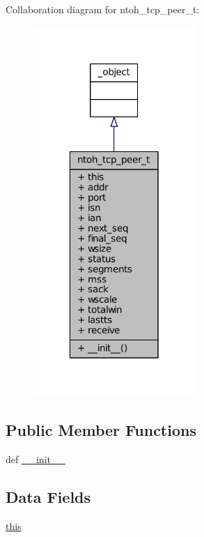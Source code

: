 Collaboration diagram for ntoh\-\_\-tcp\-\_\-peer\-\_\-t\-:
\nopagebreak
\begin{figure}[H]
\begin{center}
\leavevmode
\includegraphics[width=174pt]{classlibntoh_1_1ntoh__tcp__peer__t__coll__graph}
\end{center}
\end{figure}
\subsection*{Public Member Functions}
\begin{DoxyCompactItemize}
\item 
def \hyperlink{classlibntoh_1_1ntoh__tcp__peer__t_ac775ee34451fdfa742b318538164070e}{\-\_\-\-\_\-init\-\_\-\-\_\-}
\end{DoxyCompactItemize}
\subsection*{Data Fields}
\begin{DoxyCompactItemize}
\item 
\hyperlink{classlibntoh_1_1ntoh__tcp__peer__t_a05c09a5e9d53fa7adf0a7936038c2fa3}{this}
\end{DoxyCompactItemize}
